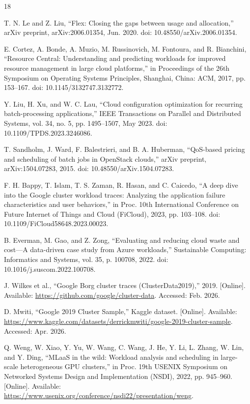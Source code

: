 \documentclass{IEEEtran}
\begin{document}
\begin{thebibliography}{18}


 T. N. Le and Z. Liu, ``Flex: Closing the gaps between usage and allocation,'' arXiv preprint, arXiv:2006.01354, Jun. 2020. doi: 10.48550/arXiv.2006.01354.

 E. Cortez, A. Bonde, A. Muzio, M. Russinovich, M. Fontoura, and R. Bianchini, ``Resource Central: Understanding and predicting workloads for improved resource management in large cloud platforms,'' in Proceedings of the 26th Symposium on Operating Systems Principles, Shanghai, China: ACM, 2017, pp. 153--167. doi: 10.1145/3132747.3132772.

 Y. Liu, H. Xu, and W. C. Lau, ``Cloud configuration optimization for recurring batch-processing applications,'' IEEE Transactions on Parallel and Distributed Systems, vol. 34, no. 5, pp. 1495--1507, May 2023. doi: 10.1109/TPDS.2023.3246086.

 T. Sandholm, J. Ward, F. Balestrieri, and B. A. Huberman, ``QoS-based pricing and scheduling of batch jobs in OpenStack clouds,'' arXiv preprint, arXiv:1504.07283, 2015. doi: 10.48550/arXiv.1504.07283.

 F. H. Bappy, T. Islam, T. S. Zaman, R. Hasan, and C. Caicedo, ``A deep dive into the Google cluster workload traces: Analyzing the application failure characteristics and user behaviors,'' in Proc. 10th International Conference on Future Internet of Things and Cloud (FiCloud), 2023, pp. 103--108. doi: 10.1109/FiCloud58648.2023.00023.

 B. Everman, M. Gao, and Z. Zong, ``Evaluating and reducing cloud waste and cost---A data-driven case study from Azure workloads,'' Sustainable Computing: Informatics and Systems, vol. 35, p. 100708, 2022. doi: 10.1016/j.suscom.2022.100708.

 J. Wilkes et al., ``Google Borg cluster traces (ClusterData2019),'' 2019. [Online]. Available: \url{https://github.com/google/cluster-data}. Accessed: Feb. 2026.

 D. Mwiti, ``Google 2019 Cluster Sample,'' Kaggle dataset. [Online]. Available: \url{https://www.kaggle.com/datasets/derrickmwiti/google-2019-cluster-sample}. Accessed: Apr. 2026.

 Q. Weng, W. Xiao, Y. Yu, W. Wang, C. Wang, J. He, Y. Li, L. Zhang, W. Lin, and Y. Ding, ``MLaaS in the wild: Workload analysis and scheduling in large-scale heterogeneous GPU clusters,'' in Proc. 19th USENIX Symposium on Networked Systems Design and Implementation (NSDI), 2022, pp. 945--960. [Online]. Available: \url{https://www.usenix.org/conference/nsdi22/presentation/weng}.


\end{thebibliography}
\end{document}
